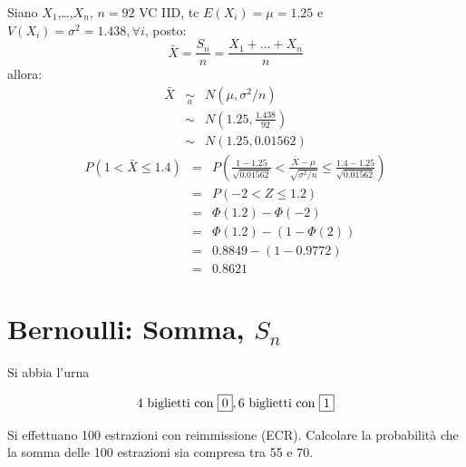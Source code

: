 \documentclass[
  11pt,
]{book}
\theoremstyle{mytheoremstyle}
\theoremstyle{mydefstyle}
\newenvironment{sol}
  {
  \begin{tcolorbox}[enhanced,breakable,arc=0.1mm,boxrule=1pt,colback=white,colframe=iblue,
  title=\bf \fontfamily{lmss}\selectfont \hspace{.5 cm} Soluzione,drop fuzzy shadow]

}{
\end{tcolorbox}
  }
\begin{document}
\begin{sol}
Siano \(X_1\),\ldots,\(X_n\), \(n=92\) VC IID, tc \(E(X_i)=\mu=1.25\) e \(V(X_i)=\sigma^2=1.438,\forall i\), posto:
\[
      \bar X=\frac{S_n}n =\frac{X_1 + ... + X_n}n
      \]
allora:\begin{eqnarray*}
  \bar X & \mathop{\sim}\limits_{a}& N(\mu,\sigma^2/n) \\
     &\sim & N\left(1.25,\frac{1.438}{92}\right) \\
     &\sim & N(1.25,0.01562)
  \end{eqnarray*}\begin{eqnarray*}
   P( 1 < \bar X \leq  1.4 ) &=& P\left( \frac { 1  -  1.25 }{\sqrt{ 0.01562 }} < \frac { \bar X  -  \mu }{ \sqrt{\sigma^2/n} } \leq \frac { 1.4  -  1.25 }{\sqrt{ 0.01562 }}\right)  \\
              &=& P\left(  -2  < Z \leq  1.2 \right) \\
              &=& \Phi( 1.2 )-\Phi( -2 )\\
              &=&  \Phi( 1.2 )-(1-\Phi( 2 )) \\ &=&  0.8849 -(1- 0.9772 ) \\ 
              &=&  0.8621 
   \end{eqnarray*}

\end{sol}

\section{\texorpdfstring{Bernoulli: Somma, \(S_{n}\)}{Bernoulli: Somma, S\_\{n\}}}\label{bernoulli-somma-s_n}

Si abbia l'urna

\[4\text{ biglietti con } \fbox{0}, 6\text{ biglietti con } \fbox{1}\]

Si effettuano 100 estrazioni con reimmissione (ECR). Calcolare la
probabilità che la somma delle 100 estrazioni sia compresa tra 55 e 70.
\end{document}
